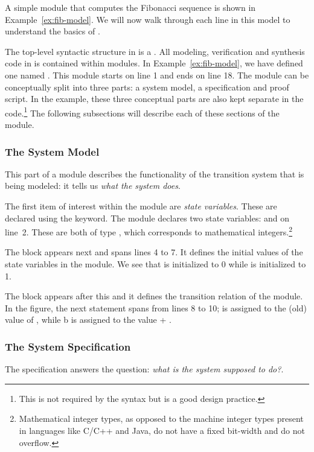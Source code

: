 A simple \uclid{} module that computes the Fibonacci sequence is shown in Example~\ref{ex:fib-model}.  We will now walk through each line in this model to understand the basics of \uclid{}.

The top-level syntactic structure in \uclid{} is a . All modeling, verification and synthesis code in \uclid{} is contained within modules. In Example~\ref{ex:fib-model}, we have defined one  named . This module starts on line 1 and ends on line 18. The module can be conceptually split into three parts: a system model, a specification and proof script. In the example, these three conceptual parts are also kept separate in the code.\footnote{This is not required by the \uclid{} syntax but is a good design practice.} The following subsections will describe each of these sections of the module. 

\subsubsection{The System Model}
This part of a \uclid{} module describes the functionality of the transition system that is being modeled: it tells us \emph{what the system does}.

The first item of interest within the module  are \emph{state variables}. These are declared using the  keyword. The module  declares two state variables:  and  on line~2. These are both of type , which corresponds to mathematical integers.\footnote{Mathematical integer types, as opposed to the machine integer types present in languages like C/C++ and Java, do not have a fixed bit-width and do not overflow.}

The  block appears next and spans lines 4 to 7. It defines the initial values of the state variables in the module. We see that  is initialized to 0 while  is initialized to 1.

The  block appears after this and it defines the transition relation of the module. In the figure, the next statement spans from lines 8 to 10;  is assigned to the (old) value of , while b is assigned to the value  + .

\subsubsection{The System Specification}
The specification answers the question: \emph{what is the system supposed to do?}. 

